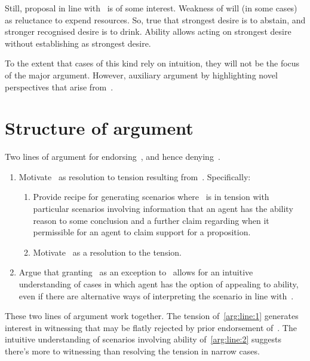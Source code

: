 \begin{note}[Examples]
  Still, proposal in line with~\EAS{} is of some interest.
  Weakness of will (in some cases) as reluctance to expend resources.
  So, true that strongest desire is to abstain, and stronger recognised desire is to drink.
  Ability allows acting on strongest desire without establishing as strongest desire.

  To the extent that cases of this kind rely on intuition, they will not be the focus of the major argument.
  However, auxiliary argument by highlighting novel perspectives that arise from~\EAS{}.
\end{note}

\section{Structure of argument}
\label{sec:structure-argument}

\begin{note}
  Two lines of argument for endorsing~\EAS{}, and hence denying~\ESU{}.
  \begin{enumerate}[label=(L\arabic*), ref=(L\arabic*)]
  \item\label{arg:line:1} Motivate~\EAS{} as resolution to tension resulting from~\ESU{}.\newline
    Specifically:
    \begin{enumerate}[label=(L1\alph*)]
    \item\label{arg:line:1:a} Provide recipe for generating scenarios where~\ESU{} is in tension with particular scenarios involving information that an agent has the ability reason to some conclusion and a further claim regarding when it permissible for an agent to claim support for a proposition.
    \item\label{arg:line:1:b} Motivate~\EAS{} as a resolution to the tension.
    \end{enumerate}
  \item\label{arg:line:2} Argue that granting~\EAS{} as an exception to~\ESU{} allows for an intuitive understanding of cases in which agent has the option of appealing to ability, even if there are alternative ways of interpreting the scenario in line with~\ESU{}.
  \end{enumerate}
  These two lines of argument work together.
  The tension of~\ref{arg:line:1} generates interest in witnessing that may be flatly rejected by prior endorsement of~\ESU{}.
  The intuitive understanding of scenarios involving ability of~\ref{arg:line:2} suggests there's more to witnessing than resolving the tension in narrow cases.
\end{note}

